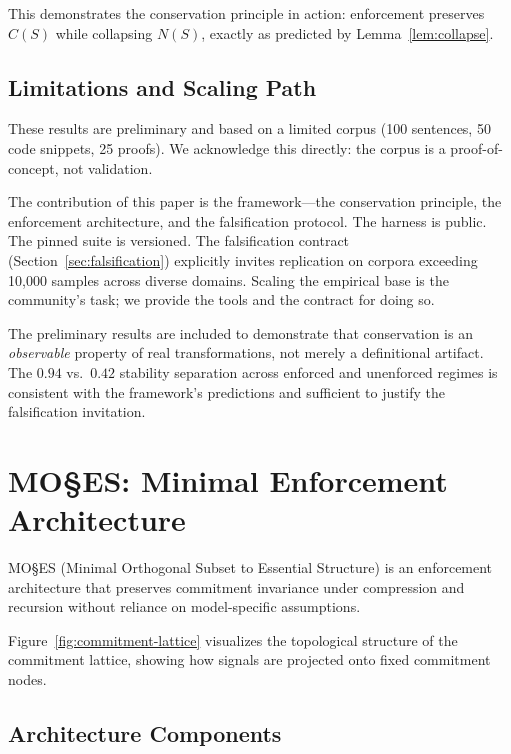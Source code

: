 \documentclass[11pt,a4paper]{article}
\begin{document}
This demonstrates the conservation principle in action: enforcement preserves $C(S)$ while collapsing $N(S)$, exactly as predicted by Lemma~\ref{lem:collapse}.

\subsection{Limitations and Scaling Path}

These results are preliminary and based on a limited corpus (100 sentences, 50 code snippets, 25 proofs). We acknowledge this directly: the corpus is a proof-of-concept, not validation.

The contribution of this paper is the framework---the conservation principle, the enforcement architecture, and the falsification protocol. The harness is public. The pinned suite is versioned. The falsification contract (Section~\ref{sec:falsification}) explicitly invites replication on corpora exceeding 10,000 samples across diverse domains. Scaling the empirical base is the community's task; we provide the tools and the contract for doing so.

The preliminary results are included to demonstrate that conservation is an \emph{observable} property of real transformations, not merely a definitional artifact. The $0.94$ vs.\ $0.42$ stability separation across enforced and unenforced regimes is consistent with the framework's predictions and sufficient to justify the falsification invitation.

\section{MO\S{}ES\texttrademark{}: Minimal Enforcement Architecture}
\label{sec:moses}

MO\S{}ES\texttrademark{} (Minimal Orthogonal Subset to Essential Structure) is an enforcement architecture that preserves commitment invariance under compression and recursion without reliance on model-specific assumptions.

Figure~\ref{fig:commitment-lattice} visualizes the topological structure of the commitment lattice, showing how signals are projected onto fixed commitment nodes.



\subsection{Architecture Components}
\end{document}
